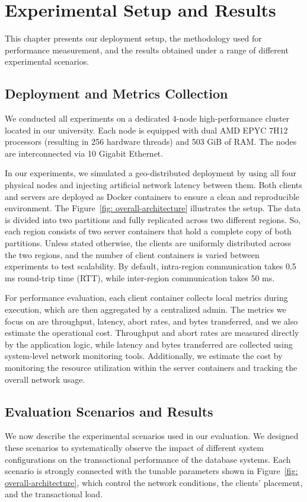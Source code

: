 \section{Experimental Setup and Results}
\label{sec: experimental-setup-and-results}
This chapter presents our deployment setup, the methodology used for performance measurement, and the results obtained under a range of different experimental scenarios.

\subsection{Deployment and Metrics Collection}
\label{subsec: deplyment-and-metrics-collection}
We conducted all experiments on a dedicated 4-node high-performance cluster located in our university. Each node is equipped with dual AMD EPYC 7H12 processors (resulting in 256 hardware threads) and 503 GiB of RAM. The nodes are interconnected via 10 Gigabit Ethernet.

In our experiments, we simulated a geo-distributed deployment by using all four physical nodes and injecting artificial network latency between them. Both clients and servers are deployed as Docker containers to ensure a clean and reproducible environment. The Figure~\ref{fig: overall-architecture} illustrates the setup. The data is divided into two partitions and fully replicated across two different regions. So, each region consists of two server containers that hold a complete copy of both partitions.  Unless stated otherwise, the clients are uniformly distributed across the two regions, and the number of client containers is varied between experiments to test scalability. By default, intra-region communication takes 0.5 ms round-trip time (RTT), while inter-region communication takes 50 ms.

For performance evaluation, each client container collects local metrics during execution, which are then aggregated by a centralized admin. The metrics we focus on are throughput, latency, abort rates, and bytes transferred, and we also estimate the operational cost. Throughput and abort rates are measured directly by the application logic, while latency and bytes transferred are collected using system-level network monitoring tools. Additionally, we estimate the cost by monitoring the resource utilization within the server containers and tracking the overall network usage.  

\subsection{Evaluation Scenarios and Results}
\label{subsec: evaluation-scenarios-and-results}
We now describe the experimental scenarios used in our evaluation. We designed these scenarios to systematically observe the impact of different system configurations on the transactional performance of the database systems. Each scenario is strongly connected with the tunable parameters shown in Figure~\ref{fig: overall-architecture}, which control the network conditions, the clients' placement, and the transactional load.

